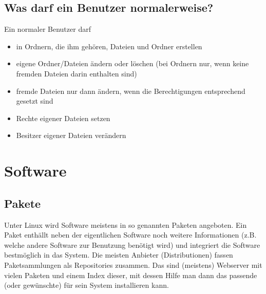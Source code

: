 \documentclass[a4paper,12pt]{article}
\begin{document}
\subsection{Was darf ein Benutzer normalerweise?}
Ein normaler Benutzer darf 
\begin{itemize}
\item in Ordnern, die ihm gehören, Dateien und Ordner erstellen
\item eigene Ordner/Dateien ändern oder löschen (bei Ordnern nur, wenn 
keine fremden Dateien darin enthalten sind)
\item fremde Dateien nur dann ändern, wenn die Berechtigungen entsprechend gesetzt sind
\item Rechte eigener Dateien setzen
\item Besitzer eigener Dateien verändern
\end{itemize}

\section{Software}
\subsection{Pakete}
Unter Linux wird Software meistens in so genannten Paketen angeboten. 
Ein Paket enthällt neben der eigentlichen Software noch weitere 
Informationen (z.B. welche andere Software zur Benutzung benötigt wird) 
und integriert die Software bestmöglich in das System. Die meisten 
Anbieter (Distributionen) fassen Paketsammlungen als Repositories zusammen. 
Das sind (meistens) Webserver mit vielen Paketen und einem Index dieser, 
mit dessen Hilfe man dann das passende (oder gewünschte) für sein System
installieren kann.
\end{document}
